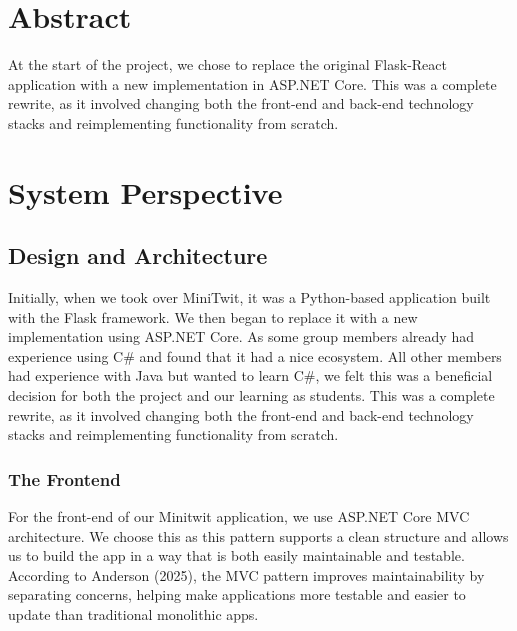 \documentclass[12pt,a4paper,reqno]{report}
\begin{document}
 
\clearpage
\tableofcontents
{}

\setcounter{page}{0}
\clearpage 

\section*{Abstract}
At the start of the project, we chose to replace the original Flask-React application with a new implementation in ASP.NET Core. This was a complete rewrite, as it involved changing both the front-end and back-end technology stacks and reimplementing functionality from scratch.

\section{System Perspective}

\subsection{Design and Architecture}


Initially, when we took over MiniTwit, it was a Python-based application built with the Flask framework. We then began to replace it with a new implementation using ASP.NET Core. As some group members already had experience using C\# and found that it had a nice ecosystem. All other members had experience with Java but wanted to learn C\#, we felt this was a beneficial decision for both the project and our learning as students. This was a complete rewrite, as it involved changing both the front-end and back-end technology stacks and reimplementing functionality from scratch.

\subsubsection{The Frontend}
For the front-end of our Minitwit application, we use ASP.NET Core MVC architecture. We choose this as this pattern supports a clean structure and allows us to build the app in a way that is both easily maintainable and testable. According to Anderson (2025), the MVC pattern improves maintainability by separating concerns, helping make applications more testable and easier to update than traditional monolithic apps.
\end{document}
